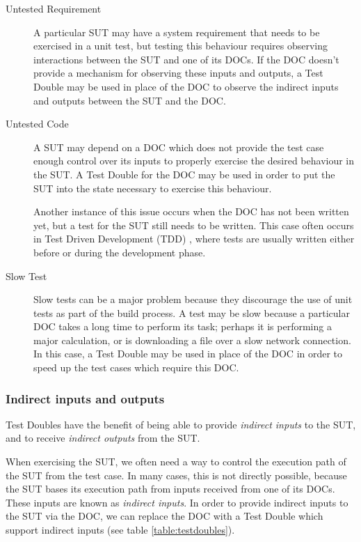 \begin{description}

\item [Untested Requirement] A particular SUT may have a system
  requirement that needs to be exercised in a unit test, but testing
  this behaviour requires observing interactions between the SUT and
  one of its DOCs. If the DOC doesn't provide a mechanism for
  observing these inputs and outputs, a Test Double may be used in
  place of the DOC to observe the indirect inputs and outputs between
  the SUT and the DOC.

\item [Untested Code] A SUT may depend on a DOC which does not provide
  the test case enough control over its inputs to properly exercise
  the desired behaviour in the SUT. A Test Double for the DOC may be
  used in order to put the SUT into the state necessary to exercise
  this behaviour.

  Another instance of this issue occurs when the DOC has not been
  written yet, but a test for the SUT still needs to be written. This
  case often occurs in Test Driven Development (TDD) \cite{beck:tdd},
  where tests are usually written either before or during the
  development phase.

\item [Slow Test] Slow tests can be a major problem because they
  discourage the use of unit tests as part of the build process. A
  test may be slow because a particular DOC takes a long time to
  perform its task; perhaps it is performing a major calculation, or
  is downloading a file over a slow network connection. In this case,
  a Test Double may be used in place of the DOC in order to speed up
  the test cases which require this DOC.

\end{description}

\subsubsection{Indirect inputs and outputs}

Test Doubles have the benefit of being able to provide
\textit{indirect inputs} to the SUT, and to receive \textit{indirect
  outputs} from the SUT.

When exercising the SUT, we often need a way to control the
execution path of the SUT from the test case. In many cases, this is
not directly possible, because the SUT bases its execution path from
inputs received from one of its DOCs. These inputs are known as
\textit{indirect inputs}. In order to provide indirect inputs to the
SUT via the DOC, we can replace the DOC with a Test Double which
support indirect inputs (see table \ref{table:testdoubles}).

